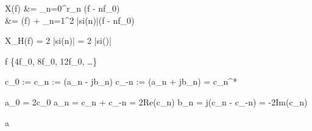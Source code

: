 
\begin{abox}
	X(f) &= \sum_{n=0}^{\infty}r_n \cdot \delta(f - nf_0)\\
	&=  \cdot\delta(f) + \sum_{n=1}^{\infty}2 \cdot \left|si\left(n\pi{}\right)\right|\cdot \delta(f - nf_0)
\end{abox}

\begin{abox}
	X_H(f) = 2 \cdot \left|si\left(n\pi{}\right)\right| = 2 \cdot \left|si\left(\pi{}\cdot{}\right)\right|
\end{abox}

\begin{abox}
	f \in \{4f_0, 8f_0, 12f_0, \dots\}
\end{abox}

\begin{abox}
	c_0 :=  \text{, } c_n := (a_n - jb_n) \text{, }	c_{-n} := (a_n + jb_n) = c_n^*
\end{abox}

\begin{abox}
	a_0 = 2c_0\text{, } a_n = c_n + c_{-n} = 2Re(c_n) \text{, } b_n = j(c_n - c_{-n}) = -2Im(c_n)
\end{abox}

\begin{abox}
	a
\end{abox}